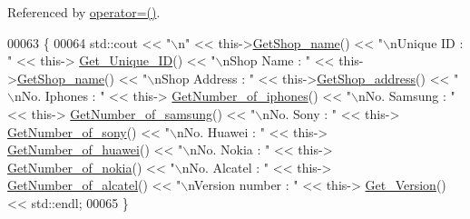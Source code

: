 Referenced by \hyperlink{_d_u_n_d_a_l_k___w_8h_source_l00075}{operator=()}.


\begin{DoxyCode}
00063 \{
00064    std::cout << \textcolor{stringliteral}{"\(\backslash\)n"} <<  this->\hyperlink{class_d_u_n_d_a_l_k___w_a1b0a9008ea26cf2181eca0dfb93acc9f_a1b0a9008ea26cf2181eca0dfb93acc9f}{GetShop\_name}() << \textcolor{stringliteral}{"\(\backslash\)nUnique ID : "} << this->
      \hyperlink{class_o_s_t_m_a5a01a8b98d16b1d1904ecf9356e7b71d_a5a01a8b98d16b1d1904ecf9356e7b71d}{Get\_Unique\_ID}() << \textcolor{stringliteral}{"\(\backslash\)nShop Name : "}  << this->\hyperlink{class_d_u_n_d_a_l_k___w_a1b0a9008ea26cf2181eca0dfb93acc9f_a1b0a9008ea26cf2181eca0dfb93acc9f}{GetShop\_name}() << \textcolor{stringliteral}{"\(\backslash\)nShop Address : 
      "} << this->\hyperlink{class_d_u_n_d_a_l_k___w_af9c0a573ae5d8b388a46652621224002_af9c0a573ae5d8b388a46652621224002}{GetShop\_address}() << \textcolor{stringliteral}{"\(\backslash\)nNo. Iphones : "} << this->
      \hyperlink{class_d_u_n_d_a_l_k___w_a8fe67b0cea3e113beaf88917768fafc9_a8fe67b0cea3e113beaf88917768fafc9}{GetNumber\_of\_iphones}() << \textcolor{stringliteral}{"\(\backslash\)nNo. Samsung : "} << this->
      \hyperlink{class_d_u_n_d_a_l_k___w_a619751e08d43b1915f191e1de6b53e30_a619751e08d43b1915f191e1de6b53e30}{GetNumber\_of\_samsung}() << \textcolor{stringliteral}{"\(\backslash\)nNo. Sony : "} << this->
      \hyperlink{class_d_u_n_d_a_l_k___w_af9830770e23fa88a55fc39c5638763b8_af9830770e23fa88a55fc39c5638763b8}{GetNumber\_of\_sony}() << \textcolor{stringliteral}{"\(\backslash\)nNo. Huawei : "} << this->
      \hyperlink{class_d_u_n_d_a_l_k___w_ab52fec6b8e051fc3aa064822d9c76d7e_ab52fec6b8e051fc3aa064822d9c76d7e}{GetNumber\_of\_huawei}() << \textcolor{stringliteral}{"\(\backslash\)nNo. Nokia : "} << this->
      \hyperlink{class_d_u_n_d_a_l_k___w_aaba4f04cd24ca7ac1d37f6d0ec76a3c7_aaba4f04cd24ca7ac1d37f6d0ec76a3c7}{GetNumber\_of\_nokia}() << \textcolor{stringliteral}{"\(\backslash\)nNo. Alcatel : "} << this->
      \hyperlink{class_d_u_n_d_a_l_k___w_ab7d0fcf5ec24a2c554e44caf50c325a3_ab7d0fcf5ec24a2c554e44caf50c325a3}{GetNumber\_of\_alcatel}() << \textcolor{stringliteral}{"\(\backslash\)nVersion number : "} << this->
      \hyperlink{class_o_s_t_m_a1f1db9d482f22c8e7caa17dfb340626b_a1f1db9d482f22c8e7caa17dfb340626b}{Get\_Version}() << std::endl;
00065 \}
\end{DoxyCode}


